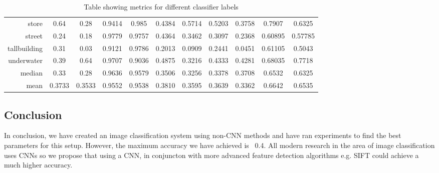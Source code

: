 \documentclass{article}
\begin{document}
\begin{multicols}{2}
\begin{table}
\begin{tabular}{r|cccccccccc}
	store        & 0.64        & 0.28        & 0.9414      & 0.985       & 0.4384      & 0.5714     & 0.5203      & 0.3758     & 0.7907            & 0.6325     \\
	street       & 0.24        & 0.18        & 0.9779      & 0.9757      & 0.4364      & 0.3462     & 0.3097      & 0.2368     & 0.60895           & 0.57785    \\
	tallbuilding & 0.31        & 0.03        & 0.9121      & 0.9786      & 0.2013      & 0.0909     & 0.2441      & 0.0451     & 0.61105           & 0.5043     \\
	underwater   & 0.39        & 0.64        & 0.9707      & 0.9036      & 0.4875      & 0.3216     & 0.4333      & 0.4281     & 0.68035           & 0.7718     \\
	\midrule
	median       & 0.33        & 0.28        & 0.9636      & 0.9579      & 0.3506      & 0.3256     & 0.3378      & 0.3708     & 0.6532            & 0.6325     \\
	mean         & 0.3733 & 0.3533 & 0.9552 & 0.9538 & 0.3810 & 0.3595    & 0.3639 & 0.3362    & 0.6642     & 0.6535   
	\end{tabular}
	\caption{Table showing metrics for different classifier labels}
	\label{table:metrics}
\end{table}

\subsection{Conclusion}
In conclusion, we have created an image classification system using non-CNN methods and have ran experiments to find the best parameters for this setup. However, the maximum accuracy we have achieved is ~0.4. All modern research in the area of image classification uses CNNs so we propose that using a CNN, in conjuncton with more advanced feature detection algorithms e.g. SIFT could achieve a much higher accuracy.



\end{multicols}
\end{document}
